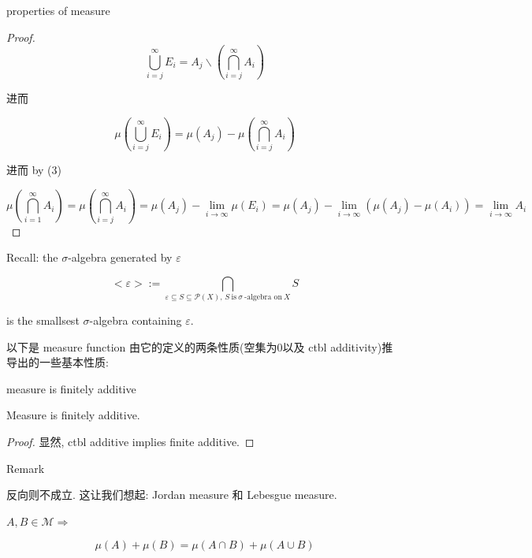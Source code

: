 \documentclass{qlnotes-export}
\begin{document}
\begin{theorem}{properties of measure}
\begin{enumerate}
\begin{proof}
  \[\bigcup\limits_{i = j}^{\infty}E_{i} = A_{j}\backslash(\bigcap\limits_{i = j}^{\infty}A_{i})\]

  进而

  \[\mu(\bigcup\limits_{i = j}^{\infty}E_{i}) = \mu(A_{j}) - \mu(\bigcap\limits_{i = j}^{\infty}A_{i})\]

  进而 by (3)

  \[\mu(\bigcap\limits_{i = 1}^{\infty}A_{i}) = \mu(\bigcap\limits_{i = j}^{\infty}A_{i}) = \mu(A_{j}) - \lim\limits_{i\rightarrow\infty}\mu(E_{i}) = \mu(A_{j}) - \lim\limits_{i\rightarrow\infty}(\mu(A_{j}) - \mu(A_{i})) = \lim\limits_{i\rightarrow\infty}A_{i}\]

  \end{proof}
\end{enumerate}

\end{theorem}

Recall: the \(\sigma\)-algebra generated by \(\varepsilon\)

\[< \varepsilon > := \bigcap\limits_{\varepsilon \subseteq S \subseteq \mathcal{P}(X),\, S\ \text{is}\ \sigma\ \text{-algebra on}\ X}S\]

is the smallsest \(\sigma\)-algebra containing \(\varepsilon\).

以下是 measure function 由它的定义的两条性质(空集为0以及 ctbl additivity)推导出的一些基本性质:

\begin{lemma}{measure is finitely additive}\label{lem-01-sigma-algebra-measure-measure-is-finitely-additive-2}

Measure is finitely additive.

\end{lemma}

\begin{proof}

显然, ctbl additive implies finite additive.

\end{proof}

\begin{qlremark}{Remark}

反向则不成立. 这让我们想起: Jordan measure 和 Lebesgue measure.

\end{qlremark}

\begin{lemma}\label{lem-01-sigma-algebra-measure-lemma-007}

\(A,B \in \mathcal{M}\Longrightarrow\)

\[\mu(A) + \mu(B) = \mu(A \cap B) + \mu(A \cup B)\]

\end{lemma}
\end{document}
